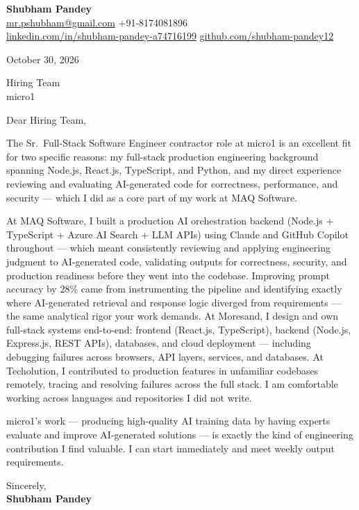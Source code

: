 \documentclass[a4paper,11pt]{article}
\begin{document}
\textbf{\Large Shubham Pandey}\\
\href{mailto:mr.pshubham@gmail.com}{mr.pshubham@gmail.com} \quad +91-8174081896\\
\href{https://www.linkedin.com/in/shubham-pandey-a74716199/}{linkedin.com/in/shubham-pandey-a74716199} \quad
\href{https://github.com/shubham-pandey12}{github.com/shubham-pandey12}

\vspace{1em}
October 30, 2026

\vspace{1em}
Hiring Team\\
micro1

\vspace{1em}
Dear Hiring Team,

The Sr.\ Full-Stack Software Engineer contractor role at micro1 is an excellent fit for two specific reasons: my full-stack production engineering background spanning Node.js, React.js, TypeScript, and Python, and my direct experience reviewing and evaluating AI-generated code for correctness, performance, and security --- which I did as a core part of my work at MAQ Software.

At MAQ Software, I built a production AI orchestration backend (Node.js + TypeScript + Azure AI Search + LLM APIs) using Claude and GitHub Copilot throughout --- which meant consistently reviewing and applying engineering judgment to AI-generated code, validating outputs for correctness, security, and production readiness before they went into the codebase. Improving prompt accuracy by 28\% came from instrumenting the pipeline and identifying exactly where AI-generated retrieval and response logic diverged from requirements --- the same analytical rigor your work demands. At Moresand, I design and own full-stack systems end-to-end: frontend (React.js, TypeScript), backend (Node.js, Express.js, REST APIs), databases, and cloud deployment --- including debugging failures across browsers, API layers, services, and databases. At Techolution, I contributed to production features in unfamiliar codebases remotely, tracing and resolving failures across the full stack. I am comfortable working across languages and repositories I did not write.

micro1's work --- producing high-quality AI training data by having experts evaluate and improve AI-generated solutions --- is exactly the kind of engineering contribution I find valuable. I can start immediately and meet weekly output requirements.

\vspace{1em}
Sincerely,\\[0.5em]
\textbf{Shubham Pandey}
\end{document}
